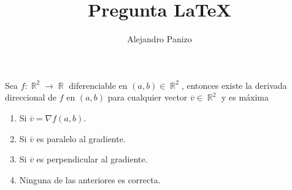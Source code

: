 \documentclass[10pt,spanish,hyperref={pdfpagelabels=false}]{beamer}
\author{Alejandro Panizo}
\title{Pregunta \LaTeX}
\DeclareMathOperator{\RR}{\mathbb{R}}
\begin{document}
\Large

\rightskip=0pt

\begin{frame}

Sea $f :\RR ^2 \to \RR$ diferenciable en $(a,b)\in \RR ^2$, entonces existe la derivada direccional de $f$ en $(a,b)$ para cualquier vector $\overline{v}\in \RR ^2$
y es m\'{a}xima

\medskip



\begin{enumerate}[1.] \rightskip=0pt
\item Si $\overline{v}=\nabla f(a,b)$.
\item Si $\overline{v}$ es paralelo al gradiente.
\item Si $\overline{v}$ es perpendicular al gradiente.
\item Ninguna de las anteriores es correcta.
\end{enumerate}


\end{frame}
\end{document}
